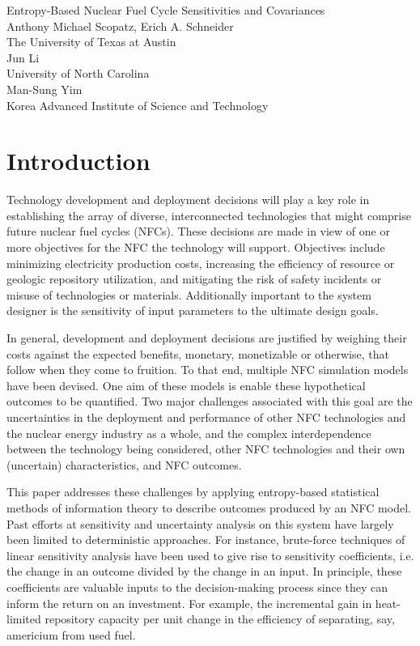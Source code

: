 \documentclass[a4paper, 12pt]{article}
\begin{document}
\begin{center}
Entropy-Based Nuclear Fuel Cycle Sensitivities and Covariances\\
\vspace{10mm}
Anthony Michael Scopatz, Erich A. Schneider\\
The University of Texas at Austin\\
\vspace{2mm}
Jun Li\\
University of North Carolina\\
\vspace{2mm}
Man-Sung Yim\\
Korea Advanced Institute of Science and Technology\\
\end{center}
\vspace{5mm}

\section{Introduction}
\label{sec:intro}

Technology development and deployment decisions will play a key role in
establishing the array of diverse, interconnected technologies that might comprise
future nuclear fuel cycles (NFCs).  These decisions are made in view of one or more
objectives for the NFC the technology will support.  Objectives include minimizing
electricity production costs, increasing the efficiency of resource or geologic
repository utilization, and mitigating the risk of safety incidents or misuse of
technologies or materials.  Additionally important to the system designer is the sensitivity 
of input parameters to the ultimate design goals.  

In general, development and deployment decisions are justified by weighing their costs 
against the expected benefits, monetary, monetizable or otherwise, that follow when they 
come to fruition.  To that end, multiple NFC simulation models  \cite{Jacobson2009,GENIUS1} 
have been devised.  One aim of these models is enable these hypothetical outcomes to be quantified.  
Two major challenges associated with this goal are the uncertainties in the deployment and performance 
of other NFC technologies and the nuclear energy industry as a whole, and the complex 
interdependence between the technology being considered, other NFC technologies and their 
own (uncertain) characteristics, and NFC outcomes.

This paper addresses these challenges by applying entropy-based statistical methods of information
theory to describe outcomes produced by an NFC model.  Past efforts at sensitivity and uncertainty
analysis on this system have largely been limited to deterministic approaches.  For instance,
brute-force techniques of linear sensitivity analysis have been used to give rise to sensitivity
coefficients, i.e. the change in an outcome divided by the change in an input.  In principle, these
coefficients are valuable inputs to the decision-making process since they can inform the
return on an investment.  For example, the incremental gain in heat-limited repository capacity per
unit change in the efficiency of separating, say, americium from used fuel.
\end{document}
